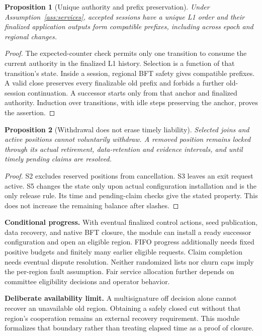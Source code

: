 \documentclass[11pt,a4paper]{article}
\newtheorem{proposition}{Proposition}
\begin{document}
\begin{proposition}[Unique authority and prefix preservation]
Under Assumption~\ref{ass:services}, accepted sessions have a unique L1
order and their finalized application outputs form compatible prefixes,
including across epoch and regional changes.
\end{proposition}
\begin{proof}
The expected-counter check permits only one transition to consume the
current authority in the finalized L1 history. Selection is a function
of that transition's state. Inside a session, regional BFT safety gives
compatible prefixes. A valid close preserves every finalizable old prefix
and forbids a further old-session continuation. A successor starts only
from that anchor and finalized authority. Induction over transitions,
with idle steps preserving the anchor, proves the assertion.
\end{proof}

\begin{proposition}[Withdrawal does not erase timely liability]
Selected joins and active positions cannot voluntarily withdraw. A removed
position remains locked through its actual retirement, data-retention and
evidence intervals, and until timely pending claims are resolved.
\end{proposition}
\begin{proof}
S2 excludes reserved positions from cancellation. S3 leaves an exit request
active. S5 changes the state only upon actual configuration installation
and is the only release rule. Its time and pending-claim checks give the
stated property. This does not increase the remaining balance after slashes.
\end{proof}

\textbf{Conditional progress.} With eventual finalized control actions,
seed publication, data recovery, and native BFT closure, the module can
install a ready successor configuration and open an eligible region.
FIFO progress additionally needs fixed positive budgets and finitely many
earlier eligible requests. Claim completion needs eventual dispute
resolution. Neither randomized lists nor churn caps imply the per-region
fault assumption. Fair service allocation further depends on committee
eligibility decisions and operator behavior.

\textbf{Deliberate availability limit.} A multisignature off decision alone
cannot recover an unavailable old region. Obtaining a safely closed cut
without that region's cooperation remains an external recovery requirement.
This module formalizes that boundary rather than treating elapsed time
as a proof of closure.
\end{document}

